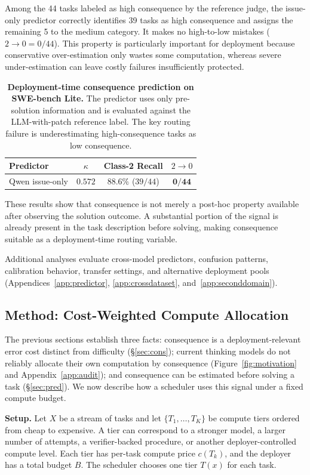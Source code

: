 \documentclass{article}
\begin{document}
Among the 44 tasks labeled as high consequence by the reference judge,
the issue-only predictor correctly identifies 39 tasks as high
consequence and assigns the remaining 5 to the medium category. It makes
no high-to-low mistakes ($2\rightarrow0=0/44$). This property is
particularly important for deployment because conservative
over-estimation only wastes some computation, whereas severe
under-estimation can leave costly failures insufficiently protected.
\begin{table}[t]
\centering
\caption{\textbf{Deployment-time consequence prediction on SWE-bench Lite.}
The predictor uses only pre-solution information and is evaluated
against the LLM-with-patch reference label. The key routing failure is
underestimating high-consequence tasks as low consequence.}
\label{tab:predictor}
\small
\setlength{\tabcolsep}{10pt}
\begin{tabular}{lccc}
\toprule
Predictor 
& $\kappa$
& Class-2 Recall
& $2\rightarrow0$
\\
\midrule
Qwen issue-only
& $\mathbf{0.572}$
& $\mathbf{88.6\%}$ ($39/44$)
& $\mathbf{0/44}$
\\
\bottomrule
\end{tabular}
\end{table}
These results show that consequence is not merely a post-hoc property
available after observing the solution outcome. A substantial portion of
the signal is already present in the task description before solving,
making consequence suitable as a deployment-time routing variable.

Additional analyses evaluate cross-model predictors, confusion
patterns, calibration behavior, transfer settings, and alternative
deployment pools (Appendices~\ref{app:predictor},
\ref{app:crossdataset}, and~\ref{app:seconddomain}).
\subsection{Method: Cost-Weighted Compute Allocation}
\label{sec:method}

The previous sections establish three facts: consequence is a
deployment-relevant error cost distinct from difficulty
(\S\ref{sec:cons}); current thinking models do not reliably allocate
their own computation by consequence (Figure~\ref{fig:motivation} and
Appendix~\ref{app:audit}); and consequence can be estimated before
solving a task (\S\ref{sec:pred}). We now describe how a scheduler uses
this signal under a fixed compute budget.

\textbf{Setup.}
Let $X$ be a stream of tasks and let
$\{T_1,\ldots,T_K\}$ be compute tiers ordered from cheap to expensive.
A tier can correspond to a stronger model, a larger number of attempts,
a verifier-backed procedure, or another deployer-controlled compute
level. Each tier has per-task compute price $c(T_k)$, and the deployer
has a total budget $B$. The scheduler chooses one tier $T(x)$ for each
task.
\end{document}
